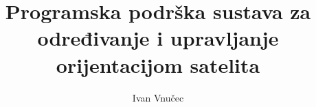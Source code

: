 \documentclass[times, utf8, diplomski, numeric]{templates/template}
\begin{document}

\title{Programska podrška sustava za određivanje i upravljanje orijentacijom satelita}


\author{Ivan Vnučec}

\maketitle

\izvornik


\tableofcontents

\nocite{*}
\end{document}
